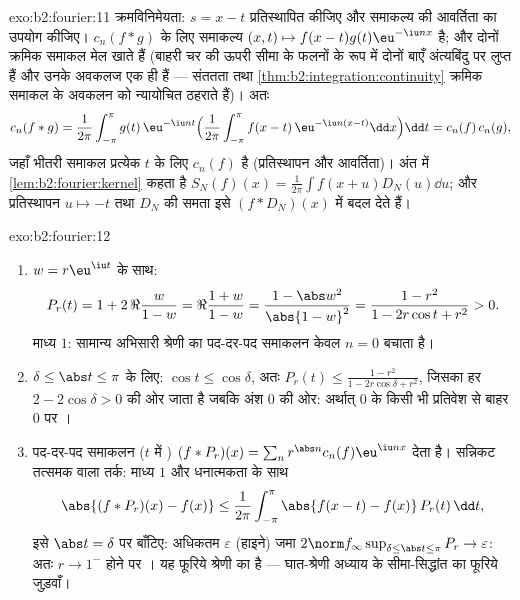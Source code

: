 \begin{solution}{exo:b2:fourier:11}
क्रमविनिमेयता: $s = x - t$ प्रतिस्थापित कीजिए और समाकल्य की आवर्तिता का उपयोग
कीजिए। $c_n(f * g)$ के लिए समाकल्य $(x, t) \mapsto
f(x-t)g(t)\eu^{-\iu nx}$  है; और दोनों क्रमिक समाकल मेल खाते हैं
(बाहरी चर की ऊपरी सीमा के फलनों के रूप में दोनों बाएँ अंत्यबिंदु पर लुप्त
हैं और उनके अवकलज एक ही हैं --- संततता तथा \cref{thm:b2:integration:continuity} क्रमिक समाकल के अवकलन को
न्यायोचित ठहराते हैं)। अतः
\[
c_n(f*g) = \frac{1}{2\pi}\int_{-\pi}^{\pi} g(t)\,\eu^{-\iu nt}
\Bigl(\frac{1}{2\pi}\int_{-\pi}^{\pi}
f(x-t)\,\eu^{-\iu n(x-t)}\dd x\Bigr)\dd t
= c_n(f)\,c_n(g),
\]
जहाँ भीतरी समाकल प्रत्येक $t$ के लिए $c_n(f)$ है (प्रतिस्थापन और आवर्तिता)।
अंत में \cref{lem:b2:fourier:kernel} कहता है $S_N(f)(x) = \frac{1}{2\pi}\int f(x+u)D_N(u)\dd u$; और प्रतिस्थापन $u \mapsto -t$ तथा $D_N$ की समता इसे $(f * D_N)(x)$ में
बदल देते हैं।
\end{solution}

\begin{solution}{exo:b2:fourier:12}
\begin{enumerate}
  \item $w = r\eu^{\iu t}$ के साथ:
        \[
        P_r(t) = 1 + 2\,\Re\frac{w}{1 - w}
        = \Re\frac{1 + w}{1 - w}
        = \frac{1 - \abs w^2}{\abs{1 - w}^2}
        = \frac{1 - r^2}{1 - 2r\cos t + r^2} > 0 .
        \]
        माध्य $1$: सामान्य अभिसारी श्रेणी का पद-दर-पद समाकलन केवल $n = 0$
        बचाता है।
  \item $\delta \leq \abs t \leq \pi$ के लिए: $\cos t \leq
        \cos\delta$, अतः $P_r(t) \leq \frac{1 - r^2}{1 -
        2r\cos\delta + r^2}$, जिसका हर $2 -
        2\cos\delta > 0$ की ओर जाता है जबकि अंश $0$
        की ओर: अर्थात् $0$ के किसी भी प्रतिवेश से बाहर $0$ पर ।
  \item पद-दर-पद समाकलन ($t$ में ) $(f * P_r)(x) = \sum_n r^{\abs
        n}c_n(f)\eu^{\iu nx}$ देता है। सन्निकट
        तत्समक वाला तर्क: माध्य $1$ और धनात्मकता के साथ
        \[
        \abs{(f*P_r)(x) - f(x)}
        \leq \frac{1}{2\pi}\int_{-\pi}^{\pi}
        \abs{f(x-t) - f(x)}\,P_r(t)\,\dd t ,
        \]
        इसे $\abs t = \delta$ पर बाँटिए: अधिकतम $\varepsilon$ (हाइने) जमा $2\norm f_\infty\sup_{\delta\leq\abs
        t\leq\pi}P_r \to \varepsilon$: अतः $r \to 1^-$ होने
        पर । यह फूरिये श्रेणी का  है --- घात-श्रेणी
        अध्याय के सीमा-सिद्धांत का फूरिये जुड़वाँ।
\end{enumerate}
\end{solution}

